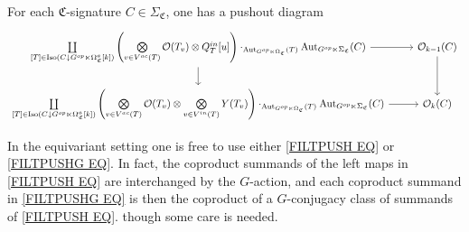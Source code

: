 \documentclass[a4paper,10pt
,draft
]{article}%
\renewcommand{\1}{\eta}%
\newcommand{\SC}{\Sigma_{\mathfrak C}}
\newcommand{\OC}{\Omega_{\mathfrak C}}
\begin{document}
\begin{proposition}
      \label{FILTPUSHG PROP}
For each $\mathfrak C$-signature $C \in \Sigma_{\mathfrak C}$, one has a pushout diagram
      \vspace{-10pt}
\begin{align}\label{FILTPUSHG EQ}
\begin{tikzcd}[ampersand replacement=\&]
	\mathop{\coprod}\limits_{[T] \in \Iso(C \downarrow G^{op} \ltimes \Omega_{\mathfrak C}^a[k])}
	\left(
		\mathop{\bigotimes}\limits_{v \in V^{ac}(T)} \O(T_v) \otimes
		Q^{in}_T[u]
	\right) \cdot_{\Aut_{G^{op} \ltimes \OC}(T)} \Aut_{G^{op} \ltimes \SC}(C)
		\arrow[r] \arrow[d]
\&
	\O_{k-1}(C) \arrow[d]
\\                  
	\mathop{\coprod}\limits_{[T] \in \Iso(C \downarrow G^{op} \ltimes \Omega_{\mathfrak C}^a[k])}
	\left(
		\mathop{\bigotimes}\limits_{v \in V^{ac}(T)} \O(T_v) \otimes
		\mathop{\bigotimes}\limits_{v \in V^{in}(T)} Y(T_v)
	\right) \cdot_{\Aut_{G^{op} \ltimes \OC}(T)} \Aut_{G^{op} \ltimes \SC}(C)
		\arrow[r]
\&
	\O_k(C)
\end{tikzcd}
\end{align}
\end{proposition}



\begin{remark} 
In the equivariant setting one is free to use either \eqref{FILTPUSH EQ} or \eqref{FILTPUSHG EQ}.
In fact, the coproduct summands of the left maps in \eqref{FILTPUSH EQ} are interchanged by the $G$-action, 
and each coproduct summand in \eqref{FILTPUSHG EQ} is then the coproduct of a $G$-conjugacy class of summands of \eqref{FILTPUSH EQ}.
%
%
though some care is needed.
\end{remark}
\end{document}
